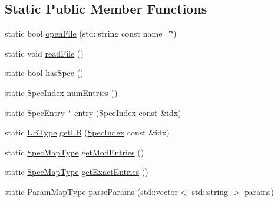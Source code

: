 \subsection*{Static Public Member Functions}
\begin{DoxyCompactItemize}
\item 
static bool \hyperlink{structvt_1_1vrt_1_1collection_1_1balance_1_1_read_l_b_spec_a17dc2fc7785cd6519440c080a472af05}{open\+File} (std\+::string const name=\char`\"{}\char`\"{})
\item 
static void \hyperlink{structvt_1_1vrt_1_1collection_1_1balance_1_1_read_l_b_spec_a4a6d3bd1ef9a432a33518d42c92d9e9b}{read\+File} ()
\item 
static bool \hyperlink{structvt_1_1vrt_1_1collection_1_1balance_1_1_read_l_b_spec_a38f65064cd81275eb9c9d596d0f0a35f}{has\+Spec} ()
\item 
static \hyperlink{namespacevt_1_1vrt_1_1collection_1_1balance_a72a5e0d9936ddf57f8e6c64e0e9fd123}{Spec\+Index} \hyperlink{structvt_1_1vrt_1_1collection_1_1balance_1_1_read_l_b_spec_ab7a988ed27206ee728474ad200c47291}{num\+Entries} ()
\item 
static \hyperlink{structvt_1_1vrt_1_1collection_1_1balance_1_1_spec_entry}{Spec\+Entry} $\ast$ \hyperlink{structvt_1_1vrt_1_1collection_1_1balance_1_1_read_l_b_spec_af9e1e7f7ea03e6a7bc06d38c2ca28544}{entry} (\hyperlink{namespacevt_1_1vrt_1_1collection_1_1balance_a72a5e0d9936ddf57f8e6c64e0e9fd123}{Spec\+Index} const \&idx)
\item 
static \hyperlink{namespacevt_1_1vrt_1_1collection_1_1balance_ac4f99693509affcc67db182d4aad9b5c}{L\+B\+Type} \hyperlink{structvt_1_1vrt_1_1collection_1_1balance_1_1_read_l_b_spec_a55d8e971ad0821c272aeb3c20455c389}{get\+LB} (\hyperlink{namespacevt_1_1vrt_1_1collection_1_1balance_a72a5e0d9936ddf57f8e6c64e0e9fd123}{Spec\+Index} const \&idx)
\item 
static \hyperlink{structvt_1_1vrt_1_1collection_1_1balance_1_1_read_l_b_spec_aa73c3611c615832402eeeed6fb7b8049}{Spec\+Map\+Type} \hyperlink{structvt_1_1vrt_1_1collection_1_1balance_1_1_read_l_b_spec_a8fbbc8343a79844abdfd16536ff4ea2b}{get\+Mod\+Entries} ()
\item 
static \hyperlink{structvt_1_1vrt_1_1collection_1_1balance_1_1_read_l_b_spec_aa73c3611c615832402eeeed6fb7b8049}{Spec\+Map\+Type} \hyperlink{structvt_1_1vrt_1_1collection_1_1balance_1_1_read_l_b_spec_a9a982a88b574472a21a3e574cc6c27ba}{get\+Exact\+Entries} ()
\item 
static \hyperlink{structvt_1_1vrt_1_1collection_1_1balance_1_1_read_l_b_spec_a05e30b32f0ca5df2cb160514fa0eeb41}{Param\+Map\+Type} \hyperlink{structvt_1_1vrt_1_1collection_1_1balance_1_1_read_l_b_spec_a69993cae4576e25d70929e95dad81d7e}{parse\+Params} (std\+::vector$<$ std\+::string $>$ params)

\end{DoxyCompactItemize}
